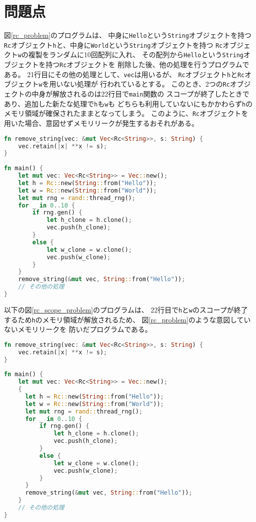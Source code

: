 \documentclass{sumiilab-paper}
\theoremstyle{mystyle}
\numberwithin{definition}{chapter} %
\begin{document}
\chapter{問題点}
図\ref{rc_problem}のプログラムは、
中身に\texttt{Hello}という\texttt{String}オブジェクトを持つ
\texttt{Rc}オブジェクト\texttt{h}と、中身に\texttt{World}という\texttt{String}オブジェクトを持つ
\texttt{Rc}オブジェクト\texttt{w}の複製をランダムに10回配列に入れ、
その配列から\texttt{Hello}という\texttt{String}オブジェクトを持つ\texttt{Rc}オブジェクトを
削除した後、他の処理を行うプログラムである。
21行目にその他の処理として、\texttt{vec}は用いるが、
\texttt{Rc}オブジェクト\texttt{h}と\texttt{Rc}オブジェクト\texttt{w}を用いない処理が
行われているとする。
このとき、2つの\texttt{Rc}オブジェクトの中身が解放されるのは22行目で\texttt{main}関数の
スコープが終了したときであり、追加した新たな処理で\texttt{h}も\texttt{w}も
どちらも利用していないにもかかわらず\texttt{h}のメモリ領域が確保されたままとなってしまう。
このように、\texttt{Rc}オブジェクトを用いた場合、意図せずメモリリークが発生するおそれがある。
\begin{lstlisting}[language=Rust, caption=Rcオブジェクトを利用する際の問題点, label=rc_problem, captionpos=b]
fn remove_string(vec: &mut Vec<Rc<String>>, s: String) {
    vec.retain(|x| **x != s);
}
  
fn main() {
    let mut vec: Vec<Rc<String>> = Vec::new();
    let h = Rc::new(String::from("Hello"));
    let w = Rc::new(String::from("World"));
    let mut rng = rand::thread_rng();
    for _ in 0..10 {
        if rng.gen() {
            let h_clone = h.clone();
            vec.push(h_clone);
        }
        else {
            let w_clone = w.clone();
            vec.push(w_clone);
        }
    }
    remove_string(&mut vec, String::from("Hello"));
    // その他の処理
}
\end{lstlisting}

以下の図\ref{rc_scope_problem}のプログラムは、
22行目で\texttt{h}と\texttt{w}のスコープが終了するため\texttt{h}のメモリ領域が解放されるため、
図\ref{rc_problem}のような意図していないメモリリークを
防いだプログラムである。
\begin{lstlisting}[language=Rust, caption=メモリリークを防いだ例, 
  label=rc_scope_problem, captionpos=b]
fn remove_string(vec: &mut Vec<Rc<String>>, s: String) {
    vec.retain(|x| **x != s);
}
  
fn main() {
    let mut vec: Vec<Rc<String>> = Vec::new();
    {
      let h = Rc::new(String::from("Hello"));
      let w = Rc::new(String::from("World"));
      let mut rng = rand::thread_rng();
      for _ in 0..10 {
          if rng.gen() {
              let h_clone = h.clone();
              vec.push(h_clone);
          }
          else {
              let w_clone = w.clone();
              vec.push(w_clone);
          }
      }
      remove_string(&mut vec, String::from("Hello"));
    }
    // その他の処理
}
\end{lstlisting}
\end{document}

